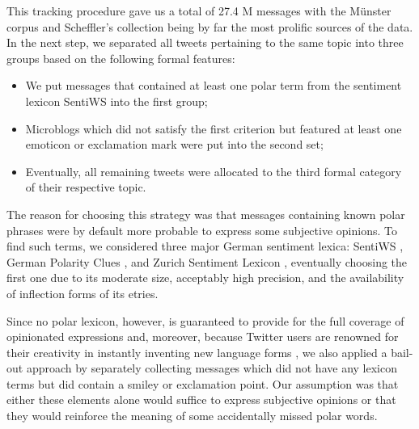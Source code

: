 This tracking procedure gave us a total of 27.4 M messages with the
M\"unster corpus and Scheffler's collection being by far the most
prolific sources of the data.  In the next step, we separated all
tweets pertaining to the same topic into three groups based on the
following formal features:
\begin{itemize}
\item We put messages that contained at least one polar term from the
  sentiment lexicon SentiWS \cite{Remus:10} into the first group;
\item Microblogs which did not satisfy the first criterion but
  featured at least one emoticon or exclamation mark were put into the
  second set;
\item Eventually, all remaining tweets were allocated to the third
  formal category of their respective topic.
\end{itemize}
The reason for choosing this strategy was that messages containing
known polar phrases were by default more probable to express some
subjective opinions.  To find such terms, we considered three major
German sentiment lexica: SentiWS \cite{Remus:10}, German Polarity
Clues \cite{Waltinger:10}, and Zurich Sentiment Lexicon
\cite{Clematide:10}, eventually choosing the first one due to its
moderate size, acceptably high precision, and the availability of
inflection forms of its etries.

Since no polar lexicon, however, is guaranteed to provide for the full
coverage of opinionated expressions and, moreover, because Twitter
users are renowned for their creativity in instantly inventing new
language forms \cite{Eisenstein:13}, we also applied a bail-out
approach by separately collecting messages which did not have any
lexicon terms but did contain a smiley or exclamation point.  Our
assumption was that either these elements alone would suffice to
express subjective opinions or that they would reinforce the meaning
of some accidentally missed polar words.

